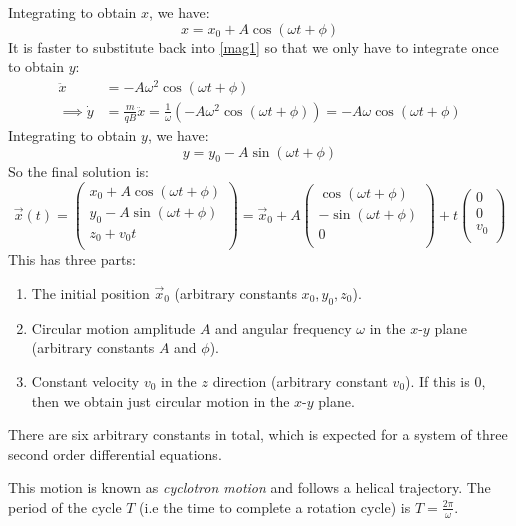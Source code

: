 \documentclass[../main.tex]{subfiles}
\begin{document}
Integrating to obtain $x$, we have:
\[
  x = x_0 + A\cos(\omega t + \phi)
\]
It is faster to substitute back into \cref{mag1} so that we only have to integrate once to obtain $y$:
\begin{align*}
  \ddot{x} &= -A\omega^2 \cos(\omega t + \phi) \\
  \implies \dot{y} &= \frac{m}{qB} \ddot{x} = \frac{1}{\omega} (-A\omega^2 \cos(\omega t + \phi)) = -A\omega\cos(\omega t + \phi)
\end{align*}
Integrating to obtain $y$, we have:
\[
  y = y_0 - A \sin(\omega t + \phi)
\]
So the final solution is:
\[
  \vec{x}(t) = \begin{pmatrix}
  x_0 + A\cos(\omega t + \phi) \\
  y_0 - A\sin(\omega t + \phi) \\
  z_0 + v_0 t \\
  \end{pmatrix} = \vec{x}_0 +
  A \begin{pmatrix}
  \cos(\omega t + \phi) \\
  -\sin(\omega t + \phi) \\
  0 \\
  \end{pmatrix} + t \begin{pmatrix}
  0 \\
  0 \\
  v_0 \\
  \end{pmatrix}
\]
This has three parts:
\begin{enumerate}
  \item The initial position $\vec{x}_0$ (arbitrary constants $x_0, y_0, z_0$).
  \item Circular motion amplitude $A$ and angular frequency $\omega$ in the $x$-$y$ plane (arbitrary constants $A$ and $\phi$).
  \item Constant velocity $v_0$ in the $z$ direction (arbitrary constant $v_0$).
    If this is 0, then we obtain just circular motion in the $x$-$y$ plane.
\end{enumerate}
\begin{remark}
  There are six arbitrary constants in total, which is expected for a system of three second order differential equations.
\end{remark}
This motion is known as \textit{cyclotron motion} and follows a helical trajectory.
The period of the cycle $T$ (i.e the time to complete a rotation cycle) is $T = \frac{2\pi}{\omega}$.
\end{document}
